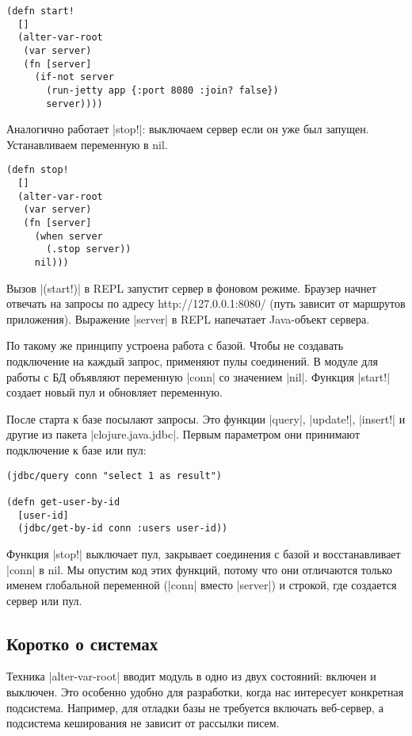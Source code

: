 \begin{verbatim}
(defn start!
  []
  (alter-var-root
   (var server)
   (fn [server]
     (if-not server
       (run-jetty app {:port 8080 :join? false})
       server))))
\end{verbatim}

Аналогично работает \spverb|stop!|: выключаем сервер если он уже был
запущен. Устанавливаем переменную в nil.

\begin{verbatim}
(defn stop!
  []
  (alter-var-root
   (var server)
   (fn [server]
     (when server
       (.stop server))
     nil)))
\end{verbatim}

Вызов \spverb|(start!)| в REPL запустит сервер в фоновом режиме. Браузер начнет
отвечать на запросы по адресу http://127.0.0.1:8080/ (путь зависит от маршрутов
приложения). Выражение \spverb|server| в REPL напечатает Java-объект сервера.

По такому же принципу устроена работа с базой. Чтобы не создавать подключение на
каждый запрос, применяют пулы соединений. В модуле для работы с БД объявляют
переменную \spverb|conn| со значением \spverb|nil|. Функция \spverb|start!| создает новый пул и
обновляет переменную.

После старта к базе посылают запросы. Это функции \spverb|query|, \spverb|update!|, \spverb|insert!|
и другие из пакета \spverb|clojure.java.jdbc|. Первым параметром они принимают
подключение к базе или пул:

\begin{verbatim}
(jdbc/query conn "select 1 as result")

(defn get-user-by-id
  [user-id]
  (jdbc/get-by-id conn :users user-id))
\end{verbatim}

Функция \spverb|stop!| выключает пул, закрывает соединения с базой и восстанавливает
\spverb|conn| в nil. Мы опустим код этих функций, потому что они отличаются только
именем глобальной переменной (\spverb|conn| вместо \spverb|server|) и строкой, где создается
сервер или пул.

\subsection{Коротко о системах}

Техника \spverb|alter-var-root| вводит модуль в одно из двух состояний: включен и
выключен. Это особенно удобно для разработки, когда нас интересует конкретная
подсистема. Например, для отладки базы не требуется включать веб-сервер, а
подсистема кеширования не зависит от рассылки писем.

